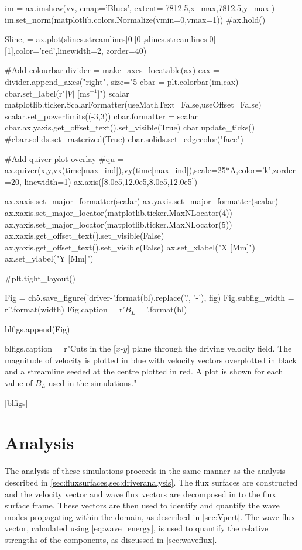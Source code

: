 \begin{pycode}[chapter5]
    im = ax.imshow(vv, cmap='Blues', extent=[7812.5,x_max,7812.5,y_max])
    im.set_norm(matplotlib.colors.Normalize(vmin=0,vmax=1))
    #ax.hold()
    
    Sline, = ax.plot(slines.streamlines[0][0],slines.streamlines[0][1],color='red',linewidth=2, zorder=40)
    
    #Add colourbar
    divider = make_axes_locatable(ax)
    cax = divider.append_axes("right", size="5%
    cbar = plt.colorbar(im,cax)
    cbar.set_label(r"$|V|$ [ms$^{-1}$]")
    scalar = matplotlib.ticker.ScalarFormatter(useMathText=False,useOffset=False)
    scalar.set_powerlimits((-3,3))
    cbar.formatter = scalar
    cbar.ax.yaxis.get_offset_text().set_visible(True)
    cbar.update_ticks()
    #cbar.solids.set_rasterized(True)
    cbar.solids.set_edgecolor("face")
    
    #Add quiver plot overlay
    #qu = ax.quiver(x,y,vx(time[max_ind]),vy(time[max_ind]),scale=25*A,color='k',zorder=20, linewidth=1)
    ax.axis([8.0e5,12.0e5,8.0e5,12.0e5])
    
    ax.xaxis.set_major_formatter(scalar)
    ax.yaxis.set_major_formatter(scalar)
    ax.xaxis.set_major_locator(matplotlib.ticker.MaxNLocator(4))
    ax.yaxis.set_major_locator(matplotlib.ticker.MaxNLocator(5))
    ax.xaxis.get_offset_text().set_visible(False)
    ax.yaxis.get_offset_text().set_visible(False)
    ax.set_xlabel("X [Mm]")
    ax.set_ylabel("Y [Mm]")
    
    #plt.tight_layout()
    
    Fig = ch5.save_figure('driver-{}'.format(bl).replace('.', '-'), fig)
    Fig.subfig_width = r'{}\columnwidth'.format(width)
    Fig.caption = r'$B_L = {}$'.format(bl)
    
    blfigs.append(Fig)
   
blfigs.caption = r"Cuts in the [$x$-$y$] plane through the driving velocity field. The magnitude of velocity is plotted in blue with velocity vectors overplotted in black and a streamline seeded at the centre plotted in red. A plot is shown for each value of $B_L$ used in the simulations."

\end{pycode}

\py[chapter5]|blfigs|

\section{Analysis}\label{sec:analysis}

The analysis of these simulations proceeds in the same manner as the analysis described in \cref{sec:fluxsurfaces,sec:driveranalysis}.
The flux surfaces are constructed and the velocity vector and wave flux vectors are decomposed in to the flux surface frame.
These vectors are then used to identify and quantify the wave modes propagating within the domain, as described in \cref{sec:Vpert}.
The wave flux vector, calculated using \cref{eq:wave_energy}, is used to quantify the relative strengths of the components, as discussed in \cref{sec:waveflux}.

